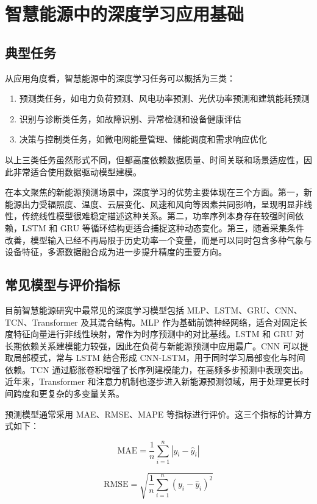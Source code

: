 \section{智慧能源中的深度学习应用基础}

\subsection{典型任务}
从应用角度看，智慧能源中的深度学习任务可以概括为三类：

\begin{enumerate}
    \item 预测类任务，如电力负荷预测、风电功率预测、光伏功率预测和建筑能耗预测
    \item 识别与诊断类任务，如故障识别、异常检测和设备健康评估
    \item 决策与控制类任务，如微电网能量管理、储能调度和需求响应优化
\end{enumerate}

以上三类任务虽然形式不同，但都高度依赖数据质量、时间关联和场景适应性，因此非常适合使用数据驱动模型建模。

在本文聚焦的新能源预测场景中，深度学习的优势主要体现在三个方面。第一，新能源出力受辐照度、温度、云层变化、风速和风向等因素共同影响，呈现明显非线性，传统线性模型很难稳定描述这种关系。第二，功率序列本身存在较强时间依赖，LSTM 和 GRU 等循环结构更适合捕捉这种动态变化。第三，随着采集条件改善，模型输入已经不再局限于历史功率一个变量，而是可以同时包含多种气象与设备特征，多源数据融合成为进一步提升精度的重要方向。

\subsection{常见模型与评价指标}
目前智慧能源研究中最常见的深度学习模型包括 MLP、LSTM、GRU、CNN、TCN、Transformer 及其混合结构。MLP 作为基础前馈神经网络，适合对固定长度特征向量进行非线性映射，常作为时序预测中的对比基线。LSTM 和 GRU 对长期依赖关系建模能力较强，因此在负荷与新能源预测中应用最广。CNN 可以提取局部模式，常与 LSTM 结合形成 CNN-LSTM，用于同时学习局部变化与时间依赖。TCN 通过膨胀卷积增强了长序列建模能力，在高频多步预测中表现突出。近年来，Transformer 和注意力机制也逐步进入新能源预测领域，用于处理更长时间跨度和更复杂的多变量关系。


预测模型通常采用 MAE、RMSE、MAPE 等指标进行评价。这三个指标的计算方式如下：

\[
\mathrm{MAE}=\frac{1}{n}\sum_{i=1}^{n}\left|y_i-\hat{y}_i\right|
\]

\[
\mathrm{RMSE}=\sqrt{\frac{1}{n}\sum_{i=1}^{n}\left(y_i-\hat{y}_i\right)^2}
\]

